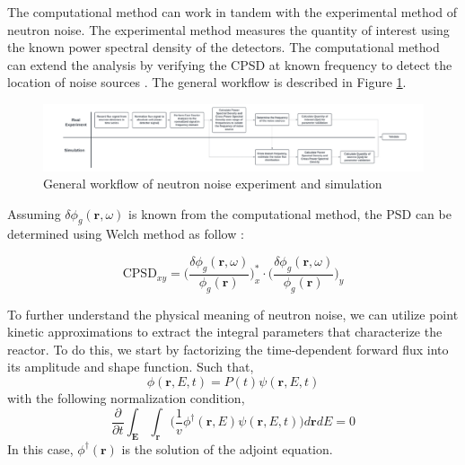 The computational method can work in tandem with the experimental method of neutron noise. The experimental method measures the quantity of interest using the known power spectral density of the detectors. The computational method can extend the analysis by verifying the CPSD at known frequency to detect the location of noise sources \cite{hursinModelingNoiseExperiments2023}. The general workflow is described in Figure \ref{fig:flow_diagram}.
\begin{figure}[h]
        \centering
        \includegraphics[width=\textwidth]{figures/ch1_Picture1.png}
        \caption{General workflow of neutron noise experiment and simulation}
        \label{fig:flow_diagram}
\end{figure}

Assuming $\delta \phi_g (\textbf{r},\omega)$ is known from the computational method, the PSD can be determined using Welch method as follow \cite{mylonakisCORESIMSIMULATIONS2021}:

\begin{equation}
        \text{CPSD}_{xy} = \biggl(\frac{\delta \phi_{g}(\textbf{r}, \omega)}{\phi_{g}(\textbf{r})} \biggr)_x^* \cdot \biggl(\frac{\delta \phi_{g}(\textbf{r}, \omega)}{\phi_{g}(\textbf{r})} \biggr)_y
        \label{eq:CPSD_comp}
\end{equation}

To further understand the physical meaning of neutron noise, we can utilize point kinetic approximations to extract the integral parameters that characterize the reactor. To do this, we start by factorizing the time-dependent forward flux into its amplitude and shape function. Such that,
\begin{equation}
        \phi (\textbf{r}, E, t) = P(t) \psi (\textbf{r}, E, t)
\end{equation}
with the following normalization condition,
\begin{equation}\label{eq:normalization}
        \frac{\partial}{\partial t} \int_{\textbf{E}} \int_{\textbf{r}} \biggl( \frac{1}{v} \phi^{\dagger}(\textbf{r}, E) \psi (\textbf{r}, E, t) \biggr) d\textbf{r} dE = 0
\end{equation}
In this case, $\phi^{\dagger}(\textbf{r})$ is the solution of the adjoint equation. 

